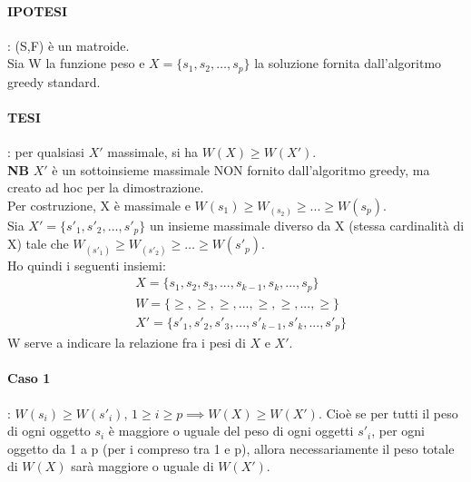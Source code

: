\paragraph*{IPOTESI}: (S,F) è un matroide.\\
Sia W la funzione peso e $X = \{s_1,s_2,\dots, s_p\}$ la soluzione fornita dall'algoritmo greedy
standard.
\paragraph*{TESI}: per qualsiasi $X'$ massimale, si ha $W(X) \geq W(X')$.\\
\textbf{NB} $X'$ è un sottoinsieme massimale NON fornito dall'algoritmo greedy, ma creato ad hoc per
la dimostrazione.\\
Per costruzione, X è massimale e $W(s_1) \geq W_(s_2) \geq ... \geq W(s_p)$.\\
Sia $X'=\{s'_1,s'_2,\dots,s'_p\}$ un insieme massimale diverso da X (stessa cardinalità di X) tale
che $W_(s'_1) \geq W_(s'_2) \geq \dots \geq W(s'_p)$.\\
Ho quindi i seguenti insiemi:
\begin{align*}
    &X = \{s_1, s_2, s_3, ..., s_{k-1}, s_k, ..., s_p\}\\
    &W = \{ \geq, \geq, \geq, ..., \geq, \geq, ..., \geq\}\\
    &X'= \{s'_1, s'_2, s'_3, ..., s'_{k-1}, s'_k, ..., s'_p\}
\end{align*}
W serve a indicare la relazione fra i pesi di $X$ e $X'$.
\paragraph*{Caso 1}: $W(s_i) \geq W(s'_i), \,1 \geq i \geq p \implies W(X) \geq W(X')$. Cioè se per tutti
il peso di ogni oggetto $s_i$ è maggiore o uguale del peso di ogni oggetti $s'_i$, per ogni oggetto da 1 a p (per i
compreso tra 1 e p), allora necessariamente il peso totale di $W(X)$ sarà maggiore o uguale di $W(X')$.
